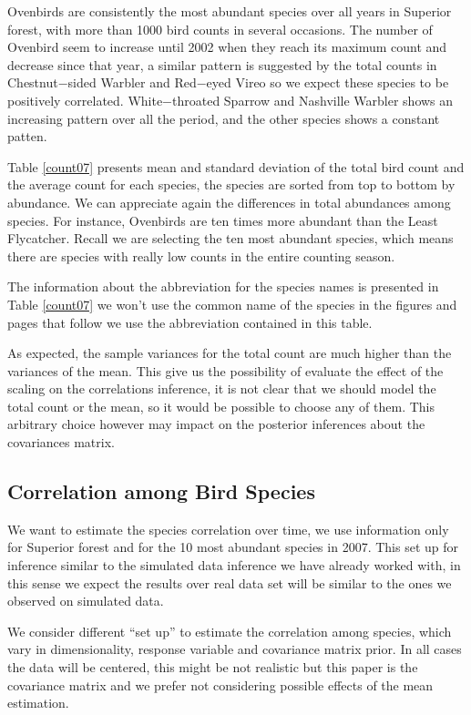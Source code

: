 \documentclass{article}
\begin{document}
Ovenbirds are consistently the most abundant species over all years in Superior forest,  with more than 1000 bird counts in several occasions. The number of Ovenbird seem to increase until 2002 when they reach its maximum count and decrease since that year, a similar pattern is suggested by the total counts in Chestnut−sided Warbler and Red−eyed Vireo so we expect these species to be positively correlated.  White−throated Sparrow and Nashville Warbler shows an increasing pattern over all the period, and the other species shows a constant patten.  

Table \ref{count07} presents  mean and standard deviation  of the total bird count and the average count for each species, the species are sorted from top to bottom by abundance.  We can appreciate again the differences in total abundances among species. For instance, Ovenbirds are ten times more abundant than the Least Flycatcher. Recall we are selecting the ten most abundant species, which means there are species with really low counts in the entire counting season. 



The information about the abbreviation for the species names is presented in Table \ref{count07} we won't use the common name of the species in the figures and pages that follow we use the abbreviation contained in this table. 

As expected, the sample variances for the total count are much higher than the variances of the mean. This give us the possibility of evaluate the effect of the scaling on the correlations inference, it is not clear that we should model the total count or the mean, so it would be possible to choose any of them. This arbitrary choice however may impact on the posterior inferences about the covariances matrix. 

\subsection{ Correlation among Bird Species}

We want to estimate the species correlation over time, we use information only for Superior forest and for the 10 most abundant species in 2007. This set up for inference similar to the simulated data inference we have already worked with, in this sense we expect the results over real data set will be similar to the ones we observed on simulated data. 

We consider different ``set up'' to estimate the correlation among species, which vary in dimensionality, response variable and covariance matrix prior. In all cases the data will be centered, this might be not realistic but this paper is the covariance matrix and we prefer not considering possible effects of the mean estimation.  
\end{document}
